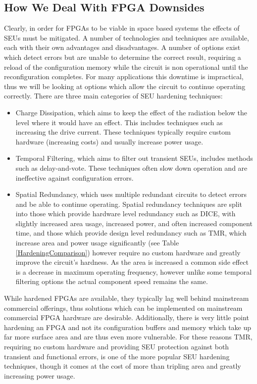 \documentclass[12pt,drafta4paper,oneside]{memoir} %
\begin{document}
\subsection{How We Deal With \acs{FPGA} Downsides}
Clearly, in order for \acp{FPGA} to be viable in space based systems the effects of \acp{SEU} must be mitigated. A number of technologies and techniques are available, each with their own advantages and disadvantages. A number of options exist which detect errors but are unable to determine the correct result, requiring a reload of the configuration memory while the circuit is non operational until the reconfiguration completes. For many applications this downtime is impractical, thus we will be looking at options which allow the circuit to continue operating correctly.
There are three main categories of \ac{SEU} hardening techniques\cite{HardeningTechniques}:
\begin{itemize}
    \item Charge Dissipation, which aims to keep the effect of the radiation below the level where it would have an effect. This includes techniques such as increasing the drive current. These techniques typically require custom hardware (increasing costs) and usually increase power usage.
    \item Temporal Filtering, which aims to filter out transient \acp{SEU}, includes methods such as delay-and-vote\cite{HardeningTechniques}. These techniques often slow down operation and are ineffective against configuration errors.
    \item Spatial Redundancy, which uses multiple redundant circuits to detect errors and be able to continue operating. Spatial redundancy techniques are split into those which provide hardware level redundancy such as \ac{DICE}\cite{DICE}, with slightly increased area usage, increased power, and often increased component time, and those which provide design level redundancy such as \ac{TMR}, which increase area and power usage significantly (see Table \ref{HardeningComparison}) however require no custom hardware and greatly improve the circuit's hardness. As the area is increased a common side effect is a decrease in maximum operating frequency, however unlike some temporal filtering options the actual component speed remains the same.
\end{itemize}
While hardened \acp{FPGA} are available, they typically lag well behind mainstream commercial offerings\cite{VFPGATMR}, thus solutions which can be implemented on mainstream commercial \ac{FPGA} hardware are desirable. Additionally, there is very little point hardening an \ac{FPGA} and not its configuration buffers and memory which take up far more surface area\cite{FPGAArch} and are thus even more vulnerable.
For these reasons \ac{TMR}, requiring no custom hardware and providing \ac{SEU} protection against both transient and functional errors, is one of the more popular \ac{SEU} hardening techniques, though it comes at the cost of more than tripling area and greatly increasing power usage.
\end{document}
